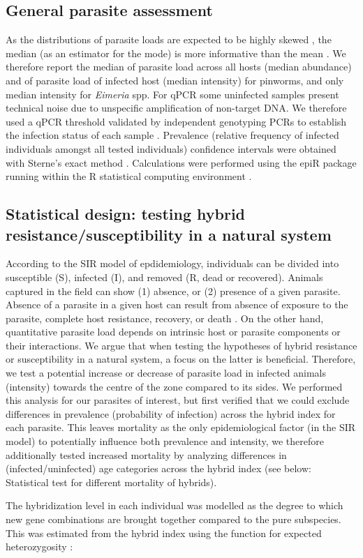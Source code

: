 \subsection{General parasite assessment}
As the distributions of parasite loads are expected to be highly skewed \citep{bliss_fitting_1953}, the median (as an estimator for the mode) is more informative than the mean \citep{rozsa_quantifying_2000}. We therefore report the median of parasite load across all hosts (median abundance) and of parasite load of infected host (median intensity) for pinworms, and only median intensity for \textit{Eimeria} spp. For qPCR some uninfected samples present technical noise due to unspecific amplification of non-target DNA. We therefore used a qPCR threshold validated by independent genotyping PCRs \parencite[see “Fig. 4” of][]{jarquin-diaz_detection_2019} to establish the infection status of each sample \parencite[and we do not report abundance for \textit{Eimeria}, see][for details]{jarquin-diaz_detection_2019}. Prevalence (relative frequency of infected individuals amongst all tested individuals) confidence intervals were obtained with Sterne’s exact method \citep{reiczigel_exact_2010, sterne_remarks_1954}. Calculations were performed using the epiR package \citep{nunes_epir_2018} running within the R statistical computing environment \citep{R_2010}.

\subsection{Statistical design: testing hybrid resistance/susceptibility in a natural system}
According to the SIR model of epdidemiology, individuals can be divided into susceptible (S), infected (I), and removed (R, dead or recovered). Animals captured in the field can show (1) absence, or (2) presence of a given parasite. Absence of a parasite in a given host can result from absence of exposure to the parasite, complete host resistance, recovery, or death \citep{kramer_modern_2010}. On the other hand, quantitative parasite load depends on intrinsic host or parasite components or their interactions. We argue that when testing the hypotheses of hybrid resistance or susceptibility in a natural system, a focus on the latter is beneficial. Therefore, we test a potential increase or decrease of parasite load in infected animals (intensity) towards the centre of the zone compared to its sides. We performed this analysis for our parasites of interest, but first verified that we could exclude differences in prevalence (probability of infection) across the hybrid index for each parasite. This leaves mortality as the only epidemiological factor (in the SIR model) to potentially influence both prevalence and intensity, we therefore additionally tested increased mortality by analyzing differences in (infected/uninfected) age categories across the hybrid index (see below: Statistical test for different mortality of hybrids). 
\par The hybridization level in each individual was modelled as the degree to which new gene combinations are brought together compared to the pure subspecies. This was estimated from the hybrid index using the function for expected heterozygosity \citep{baird_where_2012}: 

